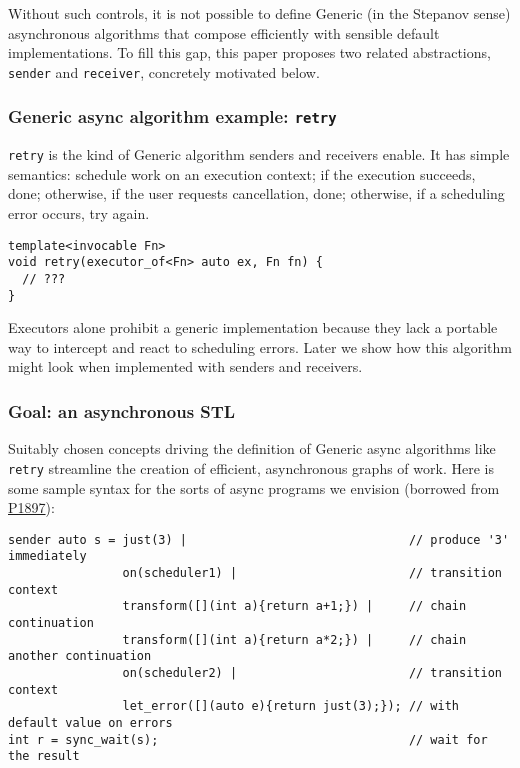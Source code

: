 \documentclass[a4paper,12pt,notitlepage,twoside,openright]{article}
\begin{document}
Without such controls, it is not possible to define Generic (in the
Stepanov sense) asynchronous algorithms that compose efficiently with
sensible default implementations. To fill this gap, this paper proposes
two related abstractions, \texttt{sender} and
\texttt{receiver}, concretely motivated below.

\hypertarget{generic-async-algorithm-example-retry}{%
\subsubsection{\texorpdfstring{Generic async algorithm example:
\texttt{retry}}{Generic async algorithm example: }}\label{generic-async-algorithm-example-retry}}

\texttt{retry} is the kind of Generic algorithm senders and
receivers enable. It has simple semantics: schedule work on an execution
context; if the execution succeeds, done; otherwise, if the user
requests cancellation, done; otherwise, if a scheduling error occurs,
try again.

\begin{verbatim}
template<invocable Fn>
void retry(executor_of<Fn> auto ex, Fn fn) {
  // ???
}
\end{verbatim}

Executors alone prohibit a generic implementation because they lack a
portable way to intercept and react to scheduling errors. Later we show
how this algorithm might look when implemented with senders and
receivers.

\hypertarget{goal-an-asynchronous-stl}{%
\subsubsection{Goal: an asynchronous
STL}\label{goal-an-asynchronous-stl}}

Suitably chosen concepts driving the definition of Generic async
algorithms like \texttt{retry} streamline the creation of
efficient, asynchronous graphs of work. Here is some sample syntax for
the sorts of async programs we envision (borrowed from
\href{http://wg21.link/P1897}{P1897}):

\begin{verbatim}
sender auto s = just(3) |                               // produce '3' immediately
                on(scheduler1) |                        // transition context
                transform([](int a){return a+1;}) |     // chain continuation
                transform([](int a){return a*2;}) |     // chain another continuation
                on(scheduler2) |                        // transition context
                let_error([](auto e){return just(3);}); // with default value on errors
int r = sync_wait(s);                                   // wait for the result
\end{verbatim}
\end{document}
